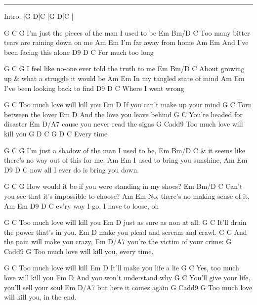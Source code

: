 \noindent\rule{\columnwidth}{1pt}
\begin{multicols}{2}
\begin{lstsong}
Intro: |G D|C |G D|C |

             G             C             G
I'm just the pieces of the man I used to be
         Em               Bm/D             C
Too many bitter tears are raining down on me
    Am            Em
I'm far away from home
              Am           Em
And I've been facing this alone
             D9     D C
For much too long

            G           C                 G
I feel like no-one ever told the truth to me
      Em                  Bm/D              C 
About growing up & what a struggle it would be
      Am               Em
In my tangled state of mind
          Am              Em
I've been looking back to find
             D9     D C
Where I went wrong

G                  C
Too much love will kill you
       Em                 D
If you can't make up your mind
G                C
Torn between the lover
        Em             D
And the love you leave behind
G                 C
You're headed for disaster
          Em             D/A7
cause you never read the signs
G                  Cadd9
Too much love will kill you
      G    D C G D C
Every time









           G             C             G
I'm just a shadow of the man I used to be,
     Em                    Bm/D            C
& it seems like there's no way out of this for me.
  Am                Em
I used to bring you sunshine,
    Am         Em              D9     D C
now all I ever do is bring you down.

             G              C              G
How would it be if you were standing in my shoes?
          Em            Bm/D          C 
Can't you see that it's impossible to choose?
    Am                Em
No, there's no making sense of it,
  Am              Em       D9     D C
ev'ry way I go, I have to  loose, oh

G                  C
Too much love will kill you
        Em             D
just as sure as non at all.
      G                         C
It'll drain the power that's in you,
         Em                   D
make you plead and scream and crawl.
        G                  C
And the pain will make you crazy,
           Em             D/A7
you're the victim of your crime:
G                  Cadd9           G
Too much love will kill you, every time.

G                  C
Too much love will kill 
      Em              D
It'll make you life a lie
     G                  C
Yes, too much love will kill you
        Em               D
And you won't understand why
       G                      C
You'll give your life, you'll sell your soul
    Em            D/A7
but here it comes again
G                  Cadd9            G
Too much love will kill you, in the end.
\end{lstsong}
\end{multicols}
